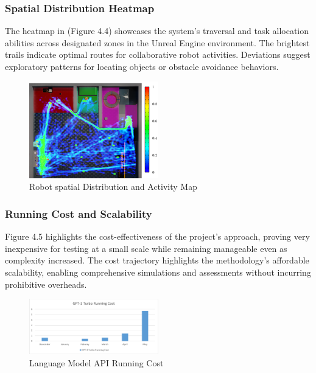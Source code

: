 \documentclass[pdflatex,sn-mathphys-num]{sn-jnl}%
\theoremstyle{thmstyleone}%
\theoremstyle{thmstyletwo}%
\theoremstyle{thmstylethree}%
\begin{document}
\subsubsection{Spatial Distribution Heatmap}
The heatmap in (Figure 4.4) showcases the system's traversal and task allocation abilities across designated zones in the Unreal Engine environment.
The brightest trails indicate optimal routes for collaborative robot activities. Deviations suggest exploratory patterns for locating objects or obstacle avoidance behaviors.
\begin{figure}[H]
\centering
\includegraphics[width=0.5\textwidth]{figures/heatmap.png}
\caption{ Robot spatial Distribution and Activity Map}\label{fig11}
\end{figure}

\subsubsection{Running Cost and Scalability}
Figure 4.5 highlights the cost-effectiveness of the project's approach, proving very inexpensive for testing at a small scale while remaining manageable even as complexity increased. The cost trajectory highlights the methodology's affordable scalability, enabling comprehensive simulations and assessments without incurring prohibitive overheads.

\begin{figure}[H]
\centering
\includegraphics[width=0.5\textwidth]{figures/running_cost.png}
\caption{Language Model API Running Cost}\label{fig11}
\end{figure}
\end{document}
